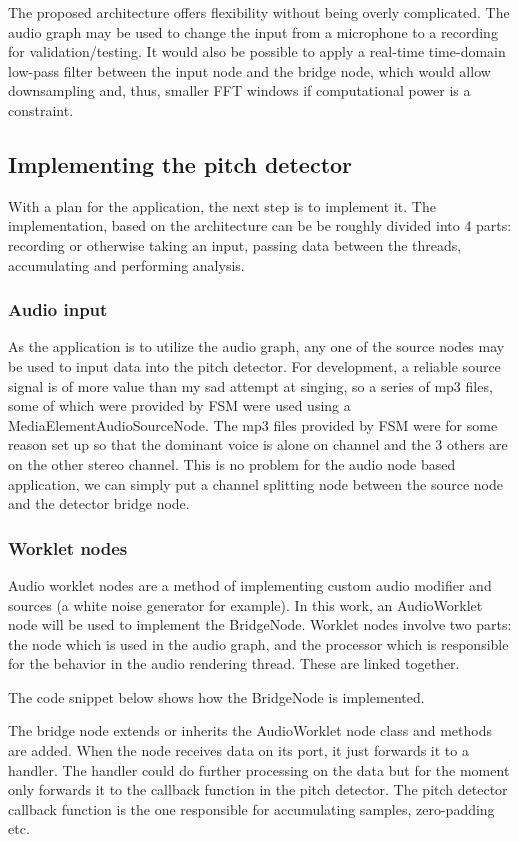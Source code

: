 The proposed architecture offers flexibility without being overly complicated. The audio graph may be used to change the input from a microphone to a recording for validation/testing. It would also be possible to apply a real-time time-domain low-pass filter between the input node and the bridge node, which would allow downsampling and, thus, smaller FFT windows if computational power is a constraint. 

\subsection{Implementing the pitch detector}
With a plan for the application, the next step is to implement it. The implementation, based on the architecture can be be roughly divided into 4 parts: recording or otherwise taking an input, passing data between the threads, accumulating and performing analysis.

\subsubsection{Audio input}
As the application is to utilize the audio graph, any one of the source nodes may be used to input data into the pitch detector. For development, a reliable source signal is of more value than my sad attempt at singing, so a series of mp3 files, some of which were provided by FSM were used using a MediaElementAudioSourceNode. The mp3 files provided by FSM were for some reason set up so that the dominant voice is alone on channel and the 3 others are on the other stereo channel. This is no problem for the audio node based application, we can simply put a channel splitting node between the source node and the detector bridge node.


\subsubsection{Worklet nodes}
Audio worklet nodes are a method of implementing custom audio modifier and sources (a white noise generator for example). In this work, an AudioWorklet node will be used to implement the BridgeNode. Worklet nodes involve two parts: the node which is used in the audio graph, and the processor which is responsible for the behavior in the audio rendering thread. These are linked together.

The code snippet below shows how the BridgeNode is implemented.

The bridge node extends or inherits the AudioWorklet node class and methods are added. When the node receives data on its port, it just forwards it to a handler. The handler could do further processing on the data but for the moment only forwards it to the callback function in the pitch detector. The pitch detector callback function is the one responsible for accumulating samples, zero-padding etc.

